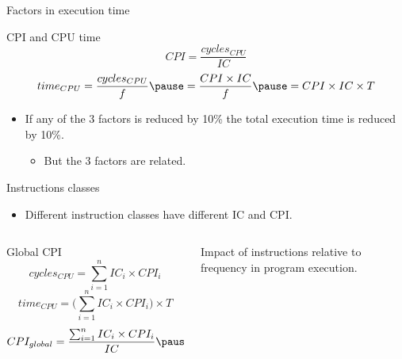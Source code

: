 \begin{frame}[t]{Factors in execution time}
\begin{block}{CPI and CPU time}
\begin{displaymath}
CPI=\frac{cycles_{CPU}}{IC}
\end{displaymath}
\pause
\begin{displaymath}
time_{CPU}=
\frac{cycles_{CPU}}{f} \pause =
\frac{CPI \times IC}{f} \pause =
CPI \times IC \times T
\end{displaymath}
\end{block}
\begin{itemize}
  \item If any of the 3 factors is reduced by 10\%
        the total execution time is reduced by 10\%.
    \begin{itemize}
      \item \alert{But the 3 factors are related}.
    \end{itemize}
\end{itemize}
\end{frame}

\begin{frame}[t]{Instructions classes}
\begin{itemize}
  \item Different instruction classes have different IC and CPI.
\end{itemize}
\begin{columns}
\begin{column}{.7\textwidth}
\begin{block}{Global CPI}
\begin{displaymath}
cycles_{CPU}=\sum_{i=1}^n IC_i \times CPI_i
\end{displaymath}
\pause
\begin{displaymath}
time_{CPU} =
\big( \sum_{i=1}^n IC_i \times CPI_i \big) \times T
\end{displaymath}
\pause
\begin{displaymath}
CPI_{global} = 
\frac
{\sum_{i=1}^n IC_i \times CPI_i}
{IC}
\pause =
\sum_{i=1}^n \frac{IC_i}{IC} \times CPI_i
\end{displaymath}
\end{block}
\end{column}
\begin{column}{.3\textwidth}
\pause
\alert{Impact of instructions relative to frequency in program execution}.
\end{column}
\end{columns}
\end{frame}

